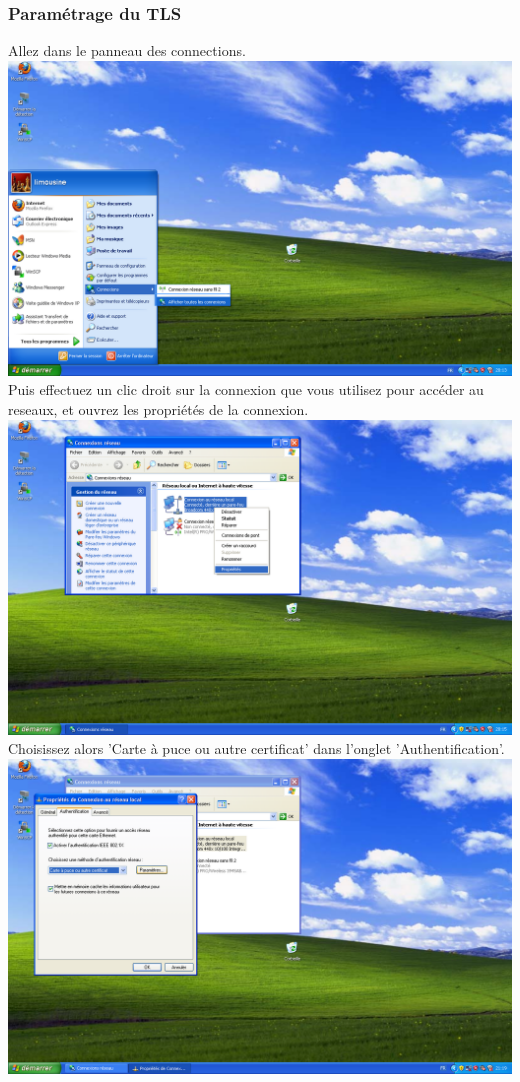 \subsubsection{Paramétrage du TLS}
Allez dans le panneau des connections.\\
\includegraphics[width=\screenShotSize{}]{imgUser/connections.PNG}\\
Puis effectuez un clic droit sur la connexion que vous utilisez pour accéder au reseaux, et ouvrez les propriétés de la connexion.\\
\includegraphics[width=\screenShotSize{}]{imgUser/connectionProperties.PNG}\\
Choisissez alors 'Carte à puce ou autre certificat' dans l'onglet 'Authentification'.\\
\includegraphics[width=\screenShotSize{}]{imgUser/tls.PNG}\\

